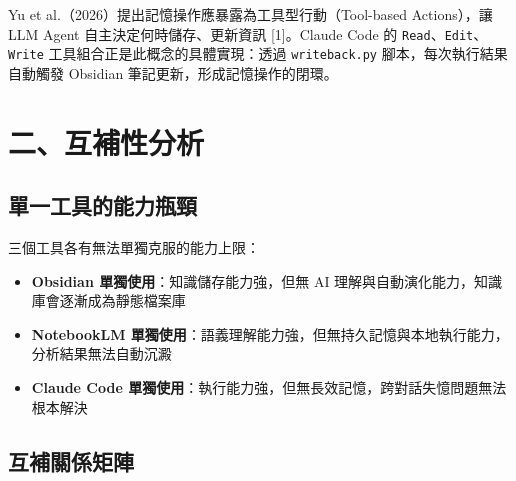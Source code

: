 Yu et al.（2026）提出記憶操作應暴露為工具型行動（Tool-based
Actions），讓 LLM Agent 自主決定何時儲存、更新資訊 {[}1{]}。Claude Code
的 \texttt{Read}、\texttt{Edit}、\texttt{Write}
工具組合正是此概念的具體實現：透過 \texttt{writeback.py}
腳本，每次執行結果自動觸發 Obsidian 筆記更新，形成記憶操作的閉環。

\section{二、互補性分析}\label{ux4e8cux4e92ux88dcux6027ux5206ux6790}

\subsection{單一工具的能力瓶頸}\label{ux55aeux4e00ux5de5ux5177ux7684ux80fdux529bux74f6ux9838}

三個工具各有無法單獨克服的能力上限：

\begin{itemize}
\tightlist
\item
  \textbf{Obsidian 單獨使用}：知識儲存能力強，但無 AI
  理解與自動演化能力，知識庫會逐漸成為靜態檔案庫
\item
  \textbf{NotebookLM
  單獨使用}：語義理解能力強，但無持久記憶與本地執行能力，分析結果無法自動沉澱
\item
  \textbf{Claude Code
  單獨使用}：執行能力強，但無長效記憶，跨對話失憶問題無法根本解決
\end{itemize}

\subsection{互補關係矩陣}\label{ux4e92ux88dcux95dcux4fc2ux77e9ux9663}

